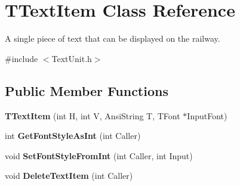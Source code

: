 \hypertarget{class_t_text_item}{}\section{T\+Text\+Item Class Reference}
\label{class_t_text_item}


A single piece of text that can be displayed on the railway.  




{\ttfamily \#include $<$Text\+Unit.\+h$>$}

\subsection*{Public Member Functions}
\begin{DoxyCompactItemize}
\item 
\mbox{\label{class_t_text_item_abb28782b47199def531bc91c70ebe6c8}} 
{\bfseries T\+Text\+Item} (int H, int V, Ansi\+String T, T\+Font $\ast$Input\+Font)
\item 
\mbox{\label{class_t_text_item_a7715fccdffe55ff5d780c4b6e22d2e7f}} 
int {\bfseries Get\+Font\+Style\+As\+Int} (int Caller)
\item 
\mbox{\label{class_t_text_item_a61c23aca0093a41c1c366c0eac7f80ca}} 
void {\bfseries Set\+Font\+Style\+From\+Int} (int Caller, int Input)
\item 
\mbox{\label{class_t_text_item_afa20e50741bdae9bed5d81a4038d572a}} 
void {\bfseries Delete\+Text\+Item} (int Caller)
\end{DoxyCompactItemize}

